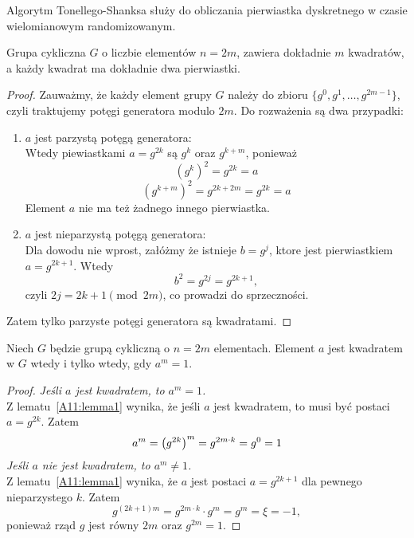 Algorytm Tonellego-Shanksa służy do obliczania pierwiastka dyskretnego w czasie wielomianowym randomizowanym.

\begin{lemma}\label{A11:lemma1}
    Grupa cykliczna \( G \) o liczbie elementów \(n = 2m \), zawiera dokładnie \( m \) kwadratów, a każdy kwadrat ma dokładnie dwa pierwiastki.
\end{lemma}
\begin{proof}
    Zauważmy, że każdy element grupy \( G \) należy do zbioru \( \{g^0, g^1, \dots, g^{2m-1}\} \), czyli traktujemy potęgi generatora modulo \( 2m \). Do rozważenia są dwa przypadki:
    \begin{enumerate}
        \item \( a \) jest parzystą potęgą generatora: \\
        Wtedy piewiastkami \( a = g^{2k} \) są \( g^k \) oraz \( g^{k+m} \), ponieważ
        \[
            (g^k)^2 = g^{2k} = a
        \]
        \[
            (g^{k+m})^2 = g^{2k+2m} = g^{2k} = a
        \]
        Element \( a \) nie ma też żadnego innego pierwiastka.
        \item \( a \) jest nieparzystą potęgą generatora: \\
        Dla dowodu nie wprost, załóżmy że istnieje \( b = g^j \), ktore jest pierwiastkiem \( a = g^{2k+1} \). Wtedy
        \[
            b^2 = g^{2j} = g^{2k + 1},
        \]
        czyli \( 2j = 2k + 1 \pmod{2m} \), co prowadzi do sprzeczności.
    \end{enumerate}
    Zatem tylko parzyste potęgi generatora są kwadratami.
\end{proof}

\newpage
\begin{lemma}\label{A11:lemma2}
    Niech \( G \) będzie grupą cykliczną o \( n = 2m \) elementach. Element \( a \) jest kwadratem w \( G \) wtedy i tylko wtedy, gdy \( a^m = 1 \).
\end{lemma}
\begin{proof}
    \textit{Jeśli \( a \) jest kwadratem, to \( a^m = 1\).} \\
    Z lematu~\ref{A11:lemma1} wynika, że jeśli \( a \) jest kwadratem, to musi być postaci \( a = g^{2k} \). Zatem
    \[
        a^m = \left(g^{2k}\right)^m = g^{2m \cdot k} = g^0 = 1
    \]
    \textit{Jeśli \( a \) nie jest kwadratem, to \( a^m \neq 1\).} \\
    Z lematu~\ref{A11:lemma1} wynika, że \( a \) jest postaci \( a = g^{2k+1} \) dla pewnego nieparzystego \( k \). Zatem
    \[
        g^{(2k+1)m} = g^{2m \cdot k} \cdot g^m = g^m = \xi = -1,
    \]
    ponieważ rząd \( g \) jest równy \( 2m \) oraz \( g^{2m} = 1 \).
\end{proof}

